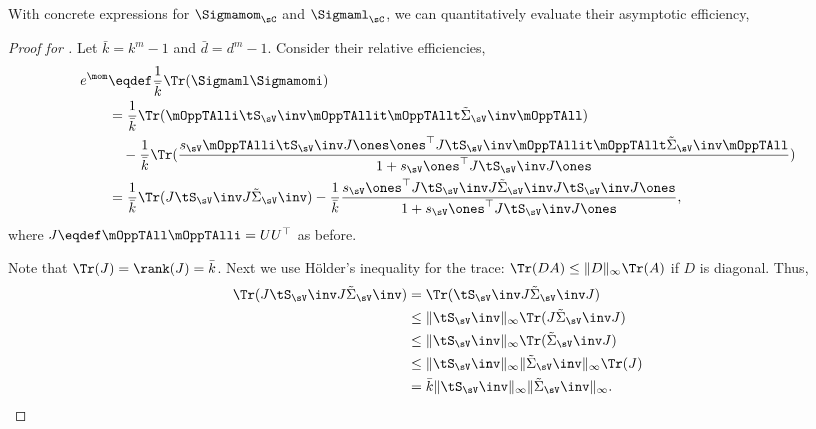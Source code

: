 With concrete expressions for $\Sigmamom_\sC$ and $\Sigmaml_\sC$, we can quantitatively evaluate their asymptotic efficiency,
\begin{proof}[Proof for ]
  Let $\bar k = k^m -1$ and $\bar d = d^m -1$. Consider their relative
  efficiencies, 
  \begin{align*}
    e^\mom 
        &\eqdef \frac{1}{\bar k} \Tr(\Sigmaml\Sigmamomi ) \\
        &= \frac{1}{\bar k} \Tr( \mOppTAlli \tS_\sV\inv \mOppTAllit \mOppTAllt \tilde\Sigma_\sV\inv \mOppTAll ) \\
      &\quad - \frac{1}{\bar k} \Tr( \frac{s_\sV \mOppTAlli \tS_\sV\inv J \ones \ones^\top J \tS_\sV\inv \mOppTAllit \mOppTAllt  \tilde\Sigma_\sV\inv \mOppTAll }
      {1 + s_\sV \ones^\top J \tS_\sV\inv J \ones} ) \\
        &= \frac{1}{\bar k} \Tr( J \tS_\sV\inv J \tilde\Sigma_\sV\inv ) - \frac{1}{\bar k} \frac{s_\sV \ones^\top J \tS_\sV\inv J \tilde\Sigma_\sV\inv J \tS_\sV\inv J \ones }
      {1 + s_\sV \ones^\top J \tS_\sV\inv J \ones},
  \end{align*}
  where $J \eqdef \mOppTAll \mOppTAlli = U U^\top$ as before. 
  
  Note that $\Tr(J) = \rank(J) = {\bar k}$.
  Next we use H\"{o}lder's inequality for the trace: $\Tr(D A) \le
  \|D\|_\infty \Tr(A)$ if $D$ is diagonal. Thus,
  \begin{align*}
      \Tr( J \tS_\sV\inv J \tilde\Sigma_\sV\inv ) 
        &= \Tr( \tS_\sV\inv J \tilde\Sigma_\sV\inv J ) \\
        &\le \|\tS_\sV\inv\|_\infty \Tr( J \tilde\Sigma_\sV\inv J ) \\
        &\le \|\tS_\sV\inv\|_\infty \Tr( \tilde\Sigma_\sV\inv J ) \\
        &\le \|\tS_\sV\inv\|_\infty \|\tilde\Sigma_\sV\inv\|_\infty \Tr( J ) \\
        &= {\bar k} \|\tS_\sV\inv\|_\infty \|\tilde\Sigma_\sV\inv\|_\infty.
  \end{align*}


\end{proof}
